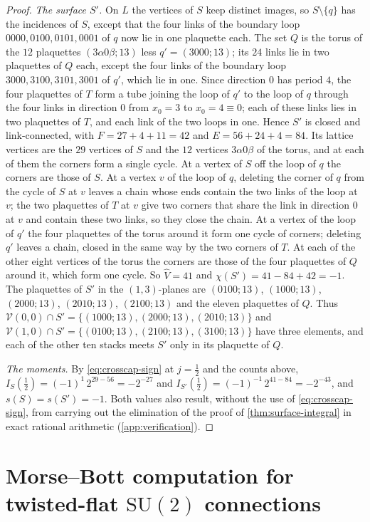 \documentclass[11pt,a4paper]{amsart}
\theoremstyle{definition}
\theoremstyle{remark}
\numberwithin{equation}{section}
\begin{document}
\begin{proof}
\emph{The surface $S'$.} On $L$ the vertices of $S$ keep distinct images, so $S\setminus\{q\}$ has the incidences of $S$, except that the four links of the boundary loop $0000,0100,0101,0001$ of $q$ now lie in one plaquette each. The set $Q$ is the torus of the $12$ plaquettes $(3\alpha0\beta;13)$ less $q'=(3000;13)$; its $24$ links lie in two plaquettes of $Q$ each, except the four links of the boundary loop $3000,3100,3101,3001$ of $q'$, which lie in one. Since direction $0$ has period $4$, the four plaquettes of $T$ form a tube joining the loop of $q'$ to the loop of $q$ through the four links in direction $0$ from $x_0=3$ to $x_0=4\equiv0$; each of these links lies in two plaquettes of $T$, and each link of the two loops in one. Hence $S'$ is closed and link-connected, with $F=27+4+11=42$ and $E=56+24+4=84$. Its lattice vertices are the $29$ vertices of $S$ and the $12$ vertices $3\alpha0\beta$ of the torus, and at each of them the corners form a single cycle. At a vertex of $S$ off the loop of $q$ the corners are those of $S$. At a vertex $v$ of the loop of $q$, deleting the corner of $q$ from the cycle of $S$ at $v$ leaves a chain whose ends contain the two links of the loop at $v$; the two plaquettes of $T$ at $v$ give two corners that share the link in direction $0$ at $v$ and contain these two links, so they close the chain. At a vertex of the loop of $q'$ the four plaquettes of the torus around it form one cycle of corners; deleting $q'$ leaves a chain, closed in the same way by the two corners of $T$. At each of the other eight vertices of the torus the corners are those of the four plaquettes of $Q$ around it, which form one cycle. So $\hat V=41$ and $\chi(S')=41-84+42=-1$. The plaquettes of $S'$ in the $(1,3)$-planes are $(0100;13)$, $(1000;13)$, $(2000;13)$, $(2010;13)$, $(2100;13)$ and the eleven plaquettes of $Q$. Thus $\mathcal V(0,0)\cap S'=\{(1000;13),(2000;13),(2010;13)\}$ and $\mathcal V(1,0)\cap S'=\{(0100;13),(2100;13),(3100;13)\}$ have three elements, and each of the other ten stacks meets $S'$ only in its plaquette of $Q$.

\emph{The moments.} By \eqref{eq:crosscap-sign} at $j=\frac12$ and the counts above, $I_S(\frac12)=(-1)^{1}\,2^{29-56}=-2^{-27}$ and $I_{S'}(\frac12)=(-1)^{-1}\,2^{41-84}=-2^{-43}$, and $s(S)=s(S')=-1$. Both values also result, without the use of \eqref{eq:crosscap-sign}, from carrying out the elimination of the proof of \cref{thm:surface-integral} in exact rational arithmetic (\cref{app:verification}).
\end{proof}
\section{Morse--Bott computation for twisted-flat $\mathrm{SU}(2)$ connections}\label{app:morse-bott}
\end{document}
